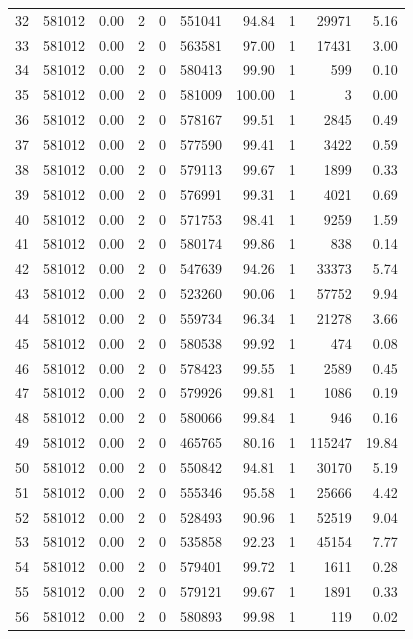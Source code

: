 \documentclass[11pt]{article}
\begin{document}
\begin{enumerate}
\begin{table}[H]
{\begin{tabular}{|l|r|r|r|l|r|r|l|r|r|}
		32 & 581012 & 0.00 & 2 & 0 & 551041 & 94.84 & 1 & 29971 & 5.16 \\
		33 & 581012 & 0.00 & 2 & 0 & 563581 & 97.00 & 1 & 17431 & 3.00 \\
		34 & 581012 & 0.00 & 2 & 0 & 580413 & 99.90 & 1 & 599 & 0.10 \\
		35 & 581012 & 0.00 & 2 & 0 & 581009 & 100.00 & 1 & 3 & 0.00 \\
		36 & 581012 & 0.00 & 2 & 0 & 578167 & 99.51 & 1 & 2845 & 0.49 \\
		37 & 581012 & 0.00 & 2 & 0 & 577590 & 99.41 & 1 & 3422 & 0.59 \\
		38 & 581012 & 0.00 & 2 & 0 & 579113 & 99.67 & 1 & 1899 & 0.33 \\
		39 & 581012 & 0.00 & 2 & 0 & 576991 & 99.31 & 1 & 4021 & 0.69 \\
		40 & 581012 & 0.00 & 2 & 0 & 571753 & 98.41 & 1 & 9259 & 1.59 \\
		41 & 581012 & 0.00 & 2 & 0 & 580174 & 99.86 & 1 & 838 & 0.14 \\
		42 & 581012 & 0.00 & 2 & 0 & 547639 & 94.26 & 1 & 33373 & 5.74 \\
		43 & 581012 & 0.00 & 2 & 0 & 523260 & 90.06 & 1 & 57752 & 9.94 \\
		44 & 581012 & 0.00 & 2 & 0 & 559734 & 96.34 & 1 & 21278 & 3.66 \\
		45 & 581012 & 0.00 & 2 & 0 & 580538 & 99.92 & 1 & 474 & 0.08 \\
		46 & 581012 & 0.00 & 2 & 0 & 578423 & 99.55 & 1 & 2589 & 0.45 \\
		47 & 581012 & 0.00 & 2 & 0 & 579926 & 99.81 & 1 & 1086 & 0.19 \\
		48 & 581012 & 0.00 & 2 & 0 & 580066 & 99.84 & 1 & 946 & 0.16 \\
		49 & 581012 & 0.00 & 2 & 0 & 465765 & 80.16 & 1 & 115247 & 19.84 \\
		50 & 581012 & 0.00 & 2 & 0 & 550842 & 94.81 & 1 & 30170 & 5.19 \\
		51 & 581012 & 0.00 & 2 & 0 & 555346 & 95.58 & 1 & 25666 & 4.42 \\
		52 & 581012 & 0.00 & 2 & 0 & 528493 & 90.96 & 1 & 52519 & 9.04 \\
		53 & 581012 & 0.00 & 2 & 0 & 535858 & 92.23 & 1 & 45154 & 7.77 \\
		54 & 581012 & 0.00 & 2 & 0 & 579401 & 99.72 & 1 & 1611 & 0.28 \\
		55 & 581012 & 0.00 & 2 & 0 & 579121 & 99.67 & 1 & 1891 & 0.33 \\
		56 & 581012 & 0.00 & 2 & 0 & 580893 & 99.98 & 1 & 119 & 0.02 \\

\end{tabular}}
\end{table}
\end{enumerate}
\end{document}
